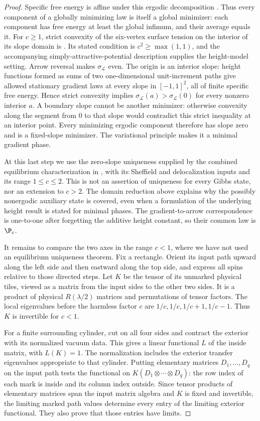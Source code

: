 \begin{proof}
Specific free energy is affine under this ergodic decomposition
\cite[Chapter 3]{Sheffield2005}.  Thus every component of a globally
minimizing law is itself a global minimizer: each component has free
energy at least the global infimum, and their average equals it.
For $c\ge1$, strict convexity of the six-vertex surface tension on the
interior of its slope domain is
\cite[Theorem 13.16 of the 2020 preprint]{LammersTassy2024}.
Its stated condition is $c^2\ge\max(1,1)$, and the accompanying
simply-attractive-potential description supplies the height-model
setting.  Arrow reversal makes $\sigma_{\mathcal L}$ even.  The origin
is an interior slope: height functions formed as sums of two
one-dimensional unit-increment paths give allowed stationary gradient
laws at every slope in $[-1,1]^2$, all of finite specific free energy.
Hence strict convexity implies
$\sigma_{\mathcal L}(a)>\sigma_{\mathcal L}(0)$ for every nonzero
interior $a$.  A boundary slope cannot be another minimizer: otherwise
convexity along the segment from $0$ to that slope would contradict
this strict inequality at an interior point.  Every minimizing ergodic
component therefore has slope zero and is a fixed-slope minimizer.
The variational principle makes it a minimal gradient phase.

At this last step we use the zero-slope uniqueness supplied by the
combined equilibrium characterization in \cite{DKLM2026}, with its
Sheffield and delocalization inputs and its range $1\le c\le2$.
This is not an assertion of uniqueness for every Gibbs state, nor an
extension to $c>2$.  The domain reduction above explains why the
possibly nonergodic auxiliary state is covered, even when a formulation
of the underlying height result is stated for minimal phases.
The gradient-to-arrow correspondence is one-to-one after forgetting
the additive height constant, so their common law is $\P_c$.

It remains to compare the two axes in the range $c<1$, where we have not
used an equilibrium uniqueness theorem.  Fix a rectangle.  Orient its
input path upward along the left side and then eastward along the top
side, and express all spins relative to those directed steps.  Let $K$
be the tensor of its unmarked physical tiles, viewed as a matrix from
the input sides to the other two sides.  It is a product of physical
$R(\lambda/2)$ matrices and permutations of tensor factors.  The local
eigenvalues before the harmless factor $c$ are
$1/c,1/c,1/c+1,1/c-1$.  Thus $K$ is invertible for $c<1$.

For a finite surrounding cylinder, cut on all four sides and contract
the exterior with its normalized vacuum data.  This gives a linear
functional $L$ of the inside matrix, with $L(K)=1$.  The normalization
includes the exterior transfer eigenvalues appropriate to that cylinder.
Putting elementary matrices $D_1,\ldots,D_q$ on the input path tests
the functional on $K(D_1\otimes\cdots\otimes D_q)$: the row index of
each mark is inside and its column index outside.  Since tensor products
of elementary matrices span the input matrix algebra and $K$ is fixed
and invertible, the limiting marked path values determine every entry
of the limiting exterior functional.  They also prove that those
entries have limits.


\end{proof}
